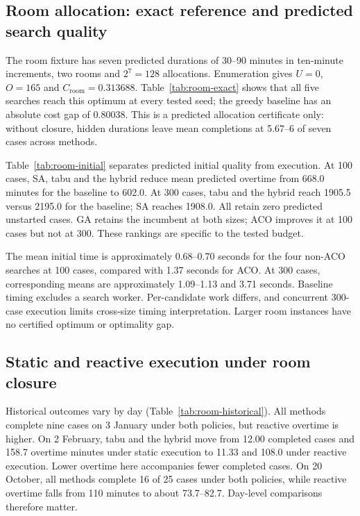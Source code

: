 \subsection{Room allocation: exact reference and predicted search quality}
\label{sec:room-results}

The room fixture has seven predicted durations of 30--90 minutes in ten-minute
increments, two rooms and $2^7=128$ allocations. Enumeration gives $U=0$,
$O=165$ and $C_{\mathrm{room}}=0.313688$. Table~\ref{tab:room-exact} shows
that all five searches reach this optimum at every tested seed; the greedy
baseline has an absolute cost gap of 0.80038. This is a predicted allocation certificate only: without closure, hidden
durations leave mean completions at 5.67--6 of seven cases across methods.



Table~\ref{tab:room-initial} separates predicted initial quality from execution.
At 100 cases, SA, tabu and the hybrid reduce mean predicted overtime from
668.0 minutes for the baseline to 602.0. At 300 cases, tabu and the hybrid
reach 1905.5 versus 2195.0 for the baseline; SA reaches 1908.0. All retain
zero predicted unstarted cases. GA retains the incumbent at both sizes;
ACO improves it at 100 cases but not at 300. These rankings are specific to the tested budget.



The mean initial time is approximately 0.68--0.70 seconds for the four
non-ACO searches at 100 cases, compared with 1.37 seconds for ACO. At
300 cases, corresponding means are approximately 1.09--1.13 and 3.71 seconds.
Baseline timing excludes a search worker. Per-candidate work differs, and
concurrent 300-case execution limits cross-size timing interpretation. Larger
room instances have no certified optimum or optimality gap.

\subsection{Static and reactive execution under room closure}

Historical outcomes vary by day (Table~\ref{tab:room-historical}). All methods
complete nine cases on 3 January under both policies, but reactive overtime
is higher. On 2 February, tabu and the hybrid move from 12.00 completed cases
and 158.7 overtime minutes under static execution to 11.33 and 108.0 under
reactive execution. Lower overtime here accompanies fewer completed cases.
On 20 October, all methods complete 16 of 25 cases under both policies, while
reactive overtime falls from 110 minutes to about 73.7--82.7. Day-level comparisons therefore matter.

